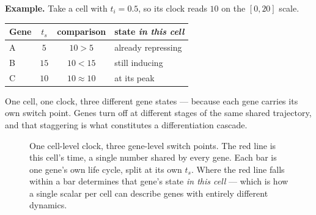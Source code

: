 \documentclass[11pt,a4paper]{article}
\newenvironment{keybox}{\begin{shaded}\noindent}{\end{shaded}}
\newcommand{\ts}{t_{s}}
\newcommand{\tmax}{t_{\max}}
\theoremstyle{definition}
\begin{document}
\begin{keybox}
\textbf{Example.} Take a cell with $t_i = 0.5$, so its clock reads $10$ on the
$[0, 20]$ scale.

\medskip
\begin{center}
\begin{tabular}{@{}lccl@{}}
\toprule
Gene & $\ts$ & comparison & state \emph{in this cell} \\
\midrule
A & $5$  & $10 > 5$    & already repressing \\
B & $15$ & $10 < 15$   & still inducing \\
C & $10$ & $10 \approx 10$ & at its peak \\
\bottomrule
\end{tabular}
\end{center}
\medskip

One cell, one clock, three different gene states --- because each gene carries
its own switch point. Genes turn off at different stages of the same shared
trajectory, and that staggering is what constitutes a differentiation cascade.
\end{keybox}

\begin{figure}[htbp]
\centering
{}
\caption{One cell-level clock, three gene-level switch points. The red line is
this cell's time, a single number shared by every gene. Each bar is one gene's
own life cycle, split at its own $\ts$. Where the red line falls within a bar
determines that gene's state \emph{in this cell} --- which is how a single
scalar per cell can describe genes with entirely different dynamics.}
\label{fig:clock}
\end{figure}
\end{document}
